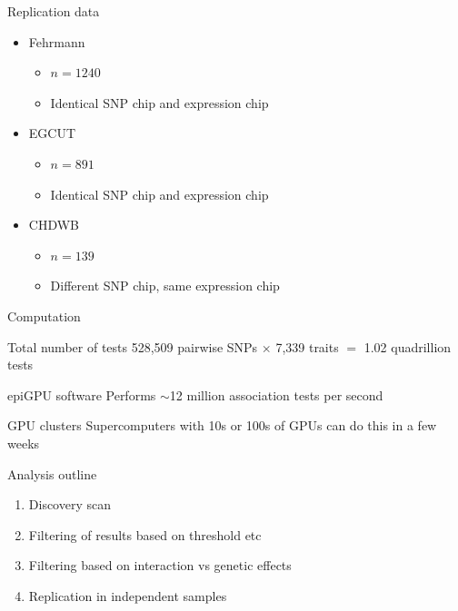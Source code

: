 \documentclass{beamer}
\begin{document}
\begin{frame}{Replication data}
	\begin{itemize}
		\item Fehrmann
		\begin{itemize}
			\item $n = 1240$
			\item Identical SNP chip and expression chip
		\end{itemize}
		\item EGCUT
		\begin{itemize}
			\item $n = 891$
			\item Identical SNP chip and expression chip
		\end{itemize}
		\item CHDWB
		\begin{itemize}
			\item $n = 139$
			\item Different SNP chip, same expression chip
		\end{itemize}
	\end{itemize}
\end{frame}


\begin{frame}{Computation}
	\begin{block}{Total number of tests}
		528,509 pairwise SNPs $\times$ 7,339 traits $=$ 1.02 quadrillion tests
	\end{block}
	\begin{block}{epiGPU software}
		Performs $\sim$12 million association tests per second
	\end{block}
	\begin{block}{GPU clusters}
		Supercomputers with 10s or 100s of GPUs can do this in a few weeks
	\end{block}
\end{frame}


\begin{frame}{Analysis outline}
	\begin{enumerate}
		\item Discovery scan
		\item Filtering of results based on threshold etc
		\item Filtering based on interaction vs genetic effects
		\item Replication in independent samples
	\end{enumerate}
\end{frame}
\end{document}

